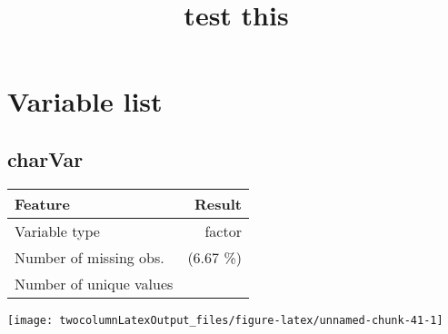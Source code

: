 \documentclass[
]{report}
\title{test this}
\author{}
\date{\vspace{-2.5em}}
\begin{document}
\maketitle

\hypertarget{variable-list}{%
\chapter{Variable list}\label{variable-list}}

\hypertarget{charvar}{%
\section{\texorpdfstring{\textbf{charVar}}{charVar}}\label{charvar}}

\begin{minipage}{0.75 \textwidth}

\begin{longtable}[]{@{}lr@{}}
\toprule
\begin{minipage}[b]{0.31\columnwidth}\raggedright
Feature\strut
\end{minipage} & \begin{minipage}[b]{0.14\columnwidth}\raggedleft
Result\strut
\end{minipage}\tabularnewline
\midrule
\endhead
\begin{minipage}[t]{0.31\columnwidth}\raggedright
Variable type\strut
\end{minipage} & \begin{minipage}[t]{0.14\columnwidth}\raggedleft
factor\strut
\end{minipage}\tabularnewline
\begin{minipage}[t]{0.31\columnwidth}\raggedright
Number of missing obs.\strut
\end{minipage} & \begin{minipage}[t]{0.14\columnwidth}\raggedleft
1 (6.67 \%)\strut
\end{minipage}\tabularnewline
\begin{minipage}[t]{0.31\columnwidth}\raggedright
Number of unique values\strut
\end{minipage} & \begin{minipage}[t]{0.14\columnwidth}\raggedleft
4\strut
\end{minipage}\tabularnewline
\bottomrule
\end{longtable}

\end{minipage}

\begin{minipage}{0.25 \textwidth}

\begin{center}\texttt{[image: twocolumnLatexOutput\_files/figure-latex/unnamed-chunk-41-1]} \end{center}
\end{minipage}
\end{document}
